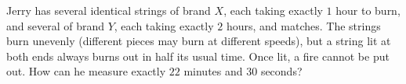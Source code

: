 Jerry has several identical strings of brand $X$, each taking exactly $1$ hour to burn, and several of brand $Y$, each taking exactly $2$ hours, and matches. The strings burn unevenly (different pieces may burn at different speeds), but a string lit at both ends always burns out in half its usual time. Once lit, a fire cannot be put out. How can he measure exactly $22$ minutes and $30$ seconds?
